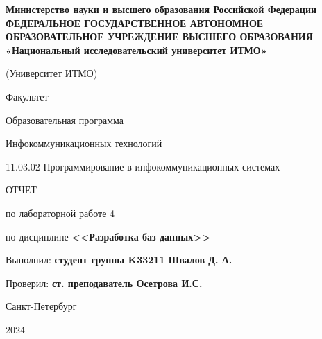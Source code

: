 \documentclass[a4paper, 14pt]{extarticle}
\begin{document}
\begin{titlepage}
  \vspace{0pt plus2fill}
  \noindent

  \vspace{0pt plus6fill}
  \begin{center}
    {
    \bfseries
    Министерство науки и высшего образования Российской Федерации
    {
    \scriptsize
    ФЕДЕРАЛЬНОЕ ГОСУДАРСТВЕННОЕ АВТОНОМНОЕ ОБРАЗОВАТЕЛЬНОЕ УЧРЕЖДЕНИЕ ВЫСШЕГО
    ОБРАЗОВАНИЯ
    }
    «Национальный исследовательский университет ИТМО»

    (Университет ИТМО)

    \begin{minipage}[t]{0.42\textwidth}
      \vspace*{0pt}
      \begin{flushright}
        Факультет

        Образовательная программа
      \end{flushright}
    \end{minipage}
    \begin{minipage}[t]{0.57\textwidth}
      \vspace*{0pt}
      \begin{flushright}
        Инфокоммуникационных технологий

        11.03.02 Программирование в инфокоммуникационных системах
      \end{flushright}
    \end{minipage}
    }

    \vspace{0pt plus5fill}

    \LARGE{
      ОТЧЕТ

      по лабораторной работе 4

      по дисциплине \textbf{<<Разработка баз данных>>}
    }
  \end{center}

  \vspace{0pt plus4fill}
  \begin{flushright}
    Выполнил: \textbf{студент группы K33211 Швалов Д. А.}

    Проверил: \textbf{ст. преподаватель Осетрова И.С.}
  \end{flushright}

  \vspace{0pt plus8fill}
  \begin{center}
    Санкт-Петербург

    2024
  \end{center}
\end{titlepage}
\end{document}
